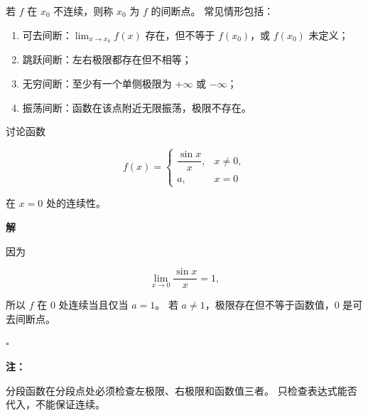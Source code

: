 \documentclass[fontset=fandol]{ctexart}
\newenvironment{solution}{\par\noindent\textbf{解}\quad}{\hfill$\square$\par\vspace{0.8em}}
\newenvironment{warning}{\par\noindent\textbf{注：}\quad}{\par\vspace{0.8em}}
\begin{document}
\begin{definition}[间断点]

若 $f$ 在 $x_0$ 不连续，则称 $x_0$ 为 $f$ 的间断点。 常见情形包括：

\begin{enumerate}[label=(\arabic*),leftmargin=2em]

\item 可去间断：$\lim_{x\to x_0}f(x)$ 存在，但不等于 $f(x_0)$，或 $f(x_0)$ 未定义；

\item 跳跃间断：左右极限都存在但不相等；

\item 无穷间断：至少有一个单侧极限为 \(+\infty\) 或 \(-\infty\)；

\item 振荡间断：函数在该点附近无限振荡，极限不存在。

\end{enumerate}

\end{definition}



\begin{example}

讨论函数

\[

f(x)=

\begin{cases}

\dfrac{\sin x}{x},&x\neq0,\\

a,&x=0

\end{cases}

\]

在 $x=0$ 处的连续性。

\end{example}

\begin{solution}

因为

\[

\lim_{x\to0}\frac{\sin x}{x}=1,

\]

所以 $f$ 在 $0$ 处连续当且仅当 $a=1$。 若 $a\neq1$，极限存在但不等于函数值，$0$ 是可去间断点。

\end{solution}

\begin{warning}

分段函数在分段点处必须检查左极限、右极限和函数值三者。 只检查表达式能否代入，不能保证连续。

\end{warning}
\end{document}

